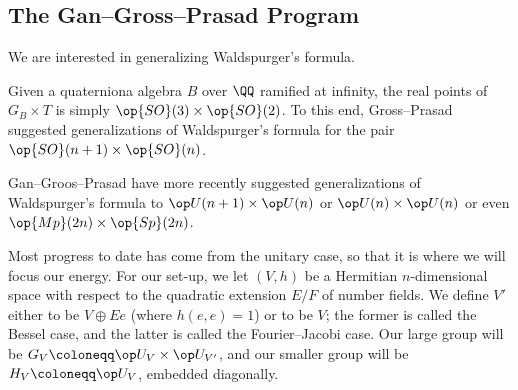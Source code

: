 \documentclass{article}
\begin{document}
\subsection{The Gan--Gross--Prasad Program}
We are interested in generalizing Waldspurger's formula.
\begin{remark}
	Given a quaterniona algebra $B$ over $\QQ$ ramified at infinity, the real points of $G_B\times T$ is simply $\op{SO}(3)\times\op{SO}(2)$. To this end, Gross--Prasad suggested generalizations of Waldspurger's formula for the pair $\op{SO}(n+1)\times\op{SO}(n)$.
\end{remark}
\begin{remark}
	Gan--Groos--Prasad have more recently suggested generalizations of Waldspurger's formula to $\op U(n+1)\times\op U(n)$ or $\op U(n)\times\op U(n)$ or even $\op{Mp}(2n)\times\op{Sp}(2n)$.
\end{remark}
Most progress to date has come from the unitary case, so that it is where we will focus our energy. For our set-up, we let $(V,h)$ be a Hermitian $n$-dimensional space with respect to the quadratic extension $E/F$ of number fields. We define $V'$ either to be $V\oplus Ee$ (where $h(e,e)=1$) or to be $V$; the former is called the Bessel case, and the latter is called the Fourier--Jacobi case. Our large group will be $G_V\coloneqq\op U_V\times\op U_{V'}$, and our smaller group will be $H_V\coloneqq\op U_V$, embedded diagonally.
\end{document}
